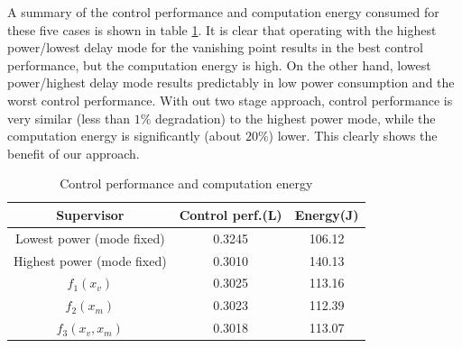 A summary of the control performance and computation energy consumed for these five cases is shown in table \ref{tbl:performance}. It is clear that operating with the highest power/lowest delay mode for the vanishing point results in the best control performance, but the computation energy is high. On the other hand, lowest power/highest delay mode results predictably in low power consumption and the worst control performance. With out two stage approach, control performance is very similar (less than $1\%$ degradation) to the highest power mode, while the computation energy is significantly (about $20\%$) lower. This clearly shows the benefit of our approach.

\begin{table}[htb]
\begin{center}
\caption{Control performance and computation energy}
\label{tbl:performance}
\begin{tabular} {|c|c|c|}
	\hline
	\textbf{Supervisor} & \textbf{Control perf.}(L) & \textbf{Energy}(J) \\ \hline
	Lowest power (mode fixed) & 0.3245 & 106.12  \\ \hline
	Highest power (mode fixed) & 0.3010 & 140.13  \\ \hline
	 $f_1(x_v)$ & 0.3025 & 113.16  \\ \hline
	 $f_2(x_m)$ & 0.3023 & 112.39 \\ \hline
	 $f_3(x_v,x_m)$ & 0.3018 & 113.07 \\ \hline
	 
\end{tabular}
	\vspace{-10pt}	
	\end{center}
\end{table}


